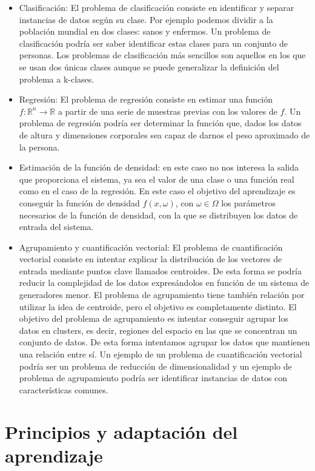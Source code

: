 \begin{itemize}
	\item Clasificación: El problema de clasificación consiste en identificar y separar instancias de datos según su clase. Por ejemplo podemos dividir a la población mundial en dos clases: sanos y enfermos. Un problema de clasificación podría ser saber identificar estas clases para un conjunto de personas. Los problemas de clasificación más sencillos son aquellos en los que se usan dos únicas clases aunque se puede generalizar la definición del problema a k-clases.
	\item Regresión: El problema de regresión consiste en estimar una función $f: \mathbb{R}^n \rightarrow \mathbb{R}$ a partir de una serie de muestras previas con los valores de $f$. Un problema de regresión podría ser determinar la función que, dados los datos de altura y dimensiones corporales sea capaz de darnos el peso aproximado de la persona.
	\item Estimación de la función de densidad: en este caso no nos interesa la salida que proporciona el sistema, ya sea el valor de una clase o una función real como en el caso de la regresión. En este caso el objetivo del aprendizaje es conseguir la función de densidad $f(x,\omega)$, con $\omega \in \Omega$ los parámetros necesarios de la función de densidad, con la que se distribuyen los datos de entrada del sistema.
	\item Agrupamiento y cuantificación vectorial: El problema de cuantificación vectorial consiste en intentar explicar la distribución de los vectores de entrada mediante puntos clave llamados centroides. De esta forma se podría reducir la complejidad de los datos expresándolos en función de un sistema de generadores menor. El problema de agrupamiento tiene también relación por utilizar la idea de centroide, pero el objetivo es completamente distinto. El objetivo del problema de agrupamiento es intentar conseguir agrupar los datos en clusters, es decir, regiones del espacio en las que se concentran un conjunto de datos. De esta forma intentamos agrupar los datos que mantienen una relación entre sí. Un ejemplo de un problema de cuantificación vectorial podría ser un problema de reducción de dimensionalidad y un ejemplo de problema de agrupamiento podría ser identificar instancias de datos con características comunes.
\end{itemize}

\section{Principios y adaptación del aprendizaje}

